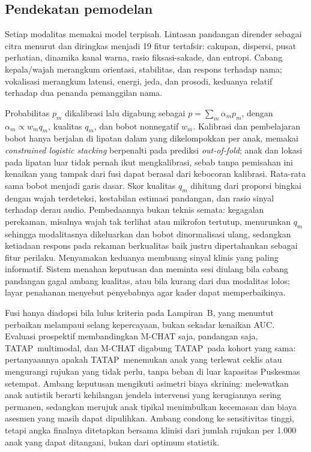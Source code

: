 \documentclass[10pt,letterpaper]{article}
\newcommand{\produk}{TATAP}
\begin{document}
\subsection{Pendekatan pemodelan}

Setiap modalitas memakai model terpisah. Lintasan pandangan dirender sebagai citra menurut
\cite{carette2019} dan diringkas menjadi 19 fitur tertafsir: cakupan, dispersi, pusat
perhatian, dinamika kanal warna, rasio fiksasi-sakade, dan entropi. Cabang kepala/wajah
merangkum orientasi, stabilitas, dan respons terhadap nama; vokalisasi merangkum latensi,
energi, jeda, dan prosodi, keduanya relatif terhadap dua penanda pemanggilan nama.

Probabilitas $p_m$ dikalibrasi lalu digabung sebagai $p=\sum_m\alpha_mp_m$, dengan
$\alpha_m\propto w_mq_m$, kualitas $q_m$, dan bobot nonnegatif $w_m$. Kalibrasi dan
pembelajaran bobot hanya berjalan di lipatan dalam yang dikelompokkan per anak, memakai
\textit{constrained logistic stacking} berpenalti pada prediksi \textit{out-of-fold}; anak dan
lokasi pada lipatan luar tidak pernah ikut mengkalibrasi, sebab tanpa pemisahan ini kenaikan
yang tampak dari fusi dapat berasal dari kebocoran kalibrasi. Rata-rata sama bobot menjadi
garis dasar. Skor kualitas $q_m$ dihitung dari proporsi bingkai dengan wajah terdeteksi,
kestabilan estimasi pandangan, dan rasio sinyal terhadap derau audio. Pembedaannya bukan
teknis semata: kegagalan perekaman, misalnya wajah tak terlihat atau mikrofon tertutup,
menurunkan $q_m$ sehingga modalitasnya dikeluarkan dan bobot dinormalisasi ulang, sedangkan
ketiadaan respons pada rekaman berkualitas baik justru dipertahankan sebagai fitur perilaku.
Menyamakan keduanya membuang sinyal klinis yang paling informatif. Sistem menahan keputusan
dan meminta sesi diulang bila cabang pandangan gagal ambang kualitas, atau bila kurang dari
dua modalitas lolos; layar penahanan menyebut penyebabnya agar kader dapat memperbaikinya.

Fusi hanya diadopsi bila lulus kriteria pada Lampiran~B, yang menuntut perbaikan melampaui
selang kepercayaan, bukan sekadar kenaikan AUC. Evaluasi prospektif membandingkan M-CHAT saja,
pandangan saja, \produk\ multimodal, dan M-CHAT digabung \produk\ pada kohort yang sama:
pertanyaannya apakah \produk\ menemukan anak yang terlewat ceklis atau mengurangi rujukan
yang tidak perlu, tanpa beban di luar kapasitas Puskesmas setempat. Ambang keputusan mengikuti
asimetri biaya skrining: melewatkan anak autistik berarti kehilangan jendela intervensi yang
kerugiannya sering permanen, sedangkan merujuk anak tipikal menimbulkan kecemasan dan biaya
asesmen yang masih dapat dipulihkan. Ambang condong ke sensitivitas tinggi, tetapi angka
finalnya ditetapkan bersama klinisi dari jumlah rujukan per 1.000 anak yang dapat ditangani,
bukan dari optimum statistik.
\end{document}
